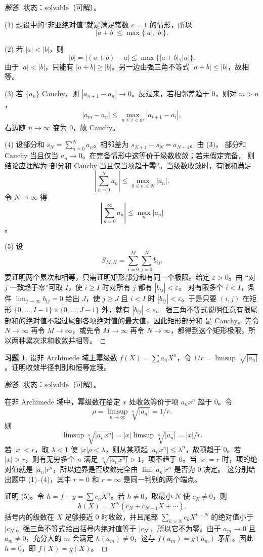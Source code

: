 \documentclass[11pt,a4paper,openany]{ctexbook}
\numberwithin{equation}{chapter}
\theoremstyle{plain}
\theoremstyle{definition}
\newtheorem{exercise}[theorem]{习题}
\theoremstyle{remark}
\begin{document}
\begin{proof}[解答]
状态：solvable（可解）。

(1) 题设中的“非亚绝对值”就是满足常数 $c=1$ 的情形，所以
\[
|a+b|\le\max\{|a|,|b|\}.
\]

(2) 若 $|a|<|b|$，则
\[
|b|=|(a+b)-a|\le\max\{|a+b|,|a|\}.
\]
由于 $|a|<|b|$，只能有 $|a+b|\ge |b|$。另一边由强三角不等式 $|a+b|\le |b|$，故相等。

(3) 若 $\{a_n\}$ Cauchy，则 $|a_{n+1}-a_n|\to0$。反过来，若相邻差趋于 $0$，则对 $m>n$，
\[
|a_m-a_n|
\le\max_{n\le i<m}|a_{i+1}-a_i|,
\]
右边随 $n\to\infty$ 变为 $0$，故 Cauchy。

(4) 设部分和 $s_N=\sum_{n=0}^N a_n$。相邻差为 $s_{N+1}-s_N=a_{N+1}$。由 (3)，
部分和 Cauchy 当且仅当 $a_n\to0$。在完备情形中这等价于级数收敛；若未假定完备，
则结论应理解为“部分和 Cauchy 当且仅当项趋于零”。当级数收敛时，有限和满足
\[
\left|\sum_{n=0}^N a_n\right|\le\max_{0\le n\le N}|a_n|.
\]
令 $N\to\infty$ 得
\[
\left|\sum_{n=0}^{\infty}a_n\right|
\le\max_n|a_n|
\]
。

(5) 设
\[
S_{M,N}=\sum_{i=0}^M\sum_{j=0}^N b_{ij}.
\]
要证明两个累次和相等，只需证明矩形部分和有同一个极限。给定 $\varepsilon>0$。由
“对 $j$ 一致趋于零”可取 $I$，使 $i\ge I$ 时对所有 $j$ 都有 $|b_{ij}|<\varepsilon$。
对有限多个 $i<I$，条件 $\lim_{j\to\infty}b_{ij}=0$ 给出 $J$，使 $j\ge J$ 且
$i<I$ 时 $|b_{ij}|<\varepsilon$。于是只要 $(i,j)$ 在矩形
$\{0,\ldots,I-1\}\times\{0,\ldots,J-1\}$ 外，就有 $|b_{ij}|<\varepsilon$。
强三角不等式说明任意有限尾部和的绝对值不超过尾部各项绝对值的最大值，因此矩形部分和
是 Cauchy。先令 $N\to\infty$ 再令 $M\to\infty$，或先令 $M\to\infty$ 再令
$N\to\infty$，都得到这个矩形极限，所以两种累次求和收敛并相等。
\end{proof}

\begin{exercise}
设非 Archimede 域上幂级数 $f(X)=\sum a_nX^n$，令 $1/r=\limsup\sqrt[n]{|a_n|}$。证明收敛半径判别和恒等定理。
\end{exercise}

\begin{proof}[解答]
状态：solvable（可解）。

在非 Archimede 域中，幂级数在给定 $x$ 处收敛等价于项 $a_nx^n$ 趋于 $0$。令
\[
\rho=\limsup_{n\to\infty}\sqrt[n]{|a_n|}=1/r.
\]
则
\[
\limsup\sqrt[n]{|a_nx^n|}
=|x|\limsup\sqrt[n]{|a_n|}
=|x|/r.
\]
若 $|x|<r$，取 $\lambda<1$ 使 $|x|\rho<\lambda$，则从某项起
$|a_nx^n|\le \lambda^n$，故项趋于 $0$。若 $|x|>r$，则有无穷多个 $n$ 满足
$\sqrt[n]{|a_nx^n|}>1$，项不趋于 $0$。当 $|x|=r$ 时，项的绝对值就是
$|a_n|r^n$，所以边界是否收敛完全由 $\lim |a_n|r^n$ 是否为 $0$ 决定。
这分别给出题中 (1)--(4)，其中 $r=0$ 和 $r=\infty$ 是同一判别的两个端点。

证明 (5)。令 $h=f-g=\sum c_nX^n$。若 $h\ne0$，取最小 $N$ 使 $c_N\ne0$，则
\[
h(X)=X^N(c_N+c_{N+1}X+\cdots).
\]
括号内的级数在 $X$ 足够接近 $0$ 时收敛，并且尾部
$\sum_{k>N}c_kX^{k-N}$ 的绝对值小于 $|c_N|$。强三角不等式给出括号内绝对值等于
$|c_N|$，所以它不为零。由于 $a_m\to0$ 且 $a_m\ne0$，充分大的 $m$ 会满足
$h(a_m)\ne0$，这与 $f(a_m)=g(a_m)$ 矛盾。因此 $h=0$，即 $f(X)=g(X)$。
\end{proof}
\end{document}
